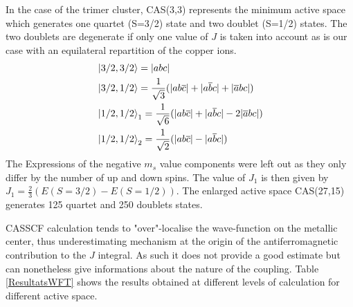 \documentclass[12pt]{report}
\numberwithin{equation}{section}
\begin{document}
In the case of the trimer cluster, CAS(3,3) represents the minimum active space which generates one quartet (S=3/2) state and two doublet (S=1/2) states. The two doublets are degenerate if only one value of $J$ is taken into account as is our case with an equilateral repartition of the copper ions.
\begin{align}
    &\ket{3/2,3/2}=|abc|\\
    &\ket{3/2,1/2}=\frac{1}{\sqrt{3}}(|ab\overline{c}|+|a\overline{b}c|+|\overline{a}bc|)\\
    &\ket{1/2,1/2}_1=\frac{1}{\sqrt{6}}(|ab\overline{c}|+|a\overline{b}c|-2|\overline{a}bc|)\\
    &\ket{1/2,1/2}_2=\frac{1}{\sqrt{2}}(|ab\overline{c}|-|a\overline{b}c|)
\end{align}
The Expressions of the negative $m_s$ value components were left out as they only differ by the number of up and down spins.
The value of $J_1$ is then given by $J_1=\frac{2}{3}(E(S=3/2)-E(S=1/2))$.
The enlarged active space CAS(27,15) generates 125 quartet and 250 doublets states.

CASSCF calculation tends to "over"-localise the wave-function on the metallic center, thus underestimating mechanism at the origin of the antiferromagnetic contribution to the $J$ integral.
As such it does not provide a good estimate but can nonetheless give informations about the nature of the coupling.
Table \ref{ResultatsWFT} shows the results obtained at different levels of calculation for different active space.

\begin{center}\label{ResultatsWFT}
    \centering
\end{center}
\end{document}
